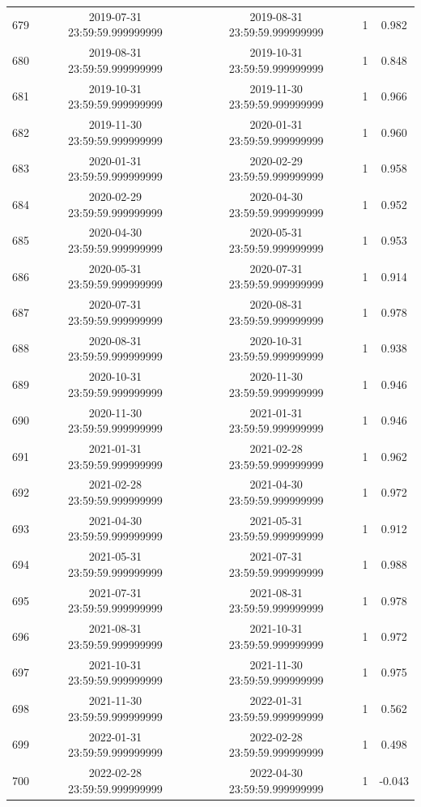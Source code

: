 \begin{table}
\begin{tabular}{lcccc}
679 & 2019-07-31 23:59:59.999999999 & 2019-08-31 23:59:59.999999999 & 1 & 0.982 \\
680 & 2019-08-31 23:59:59.999999999 & 2019-10-31 23:59:59.999999999 & 1 & 0.848 \\
681 & 2019-10-31 23:59:59.999999999 & 2019-11-30 23:59:59.999999999 & 1 & 0.966 \\
682 & 2019-11-30 23:59:59.999999999 & 2020-01-31 23:59:59.999999999 & 1 & 0.960 \\
683 & 2020-01-31 23:59:59.999999999 & 2020-02-29 23:59:59.999999999 & 1 & 0.958 \\
684 & 2020-02-29 23:59:59.999999999 & 2020-04-30 23:59:59.999999999 & 1 & 0.952 \\
685 & 2020-04-30 23:59:59.999999999 & 2020-05-31 23:59:59.999999999 & 1 & 0.953 \\
686 & 2020-05-31 23:59:59.999999999 & 2020-07-31 23:59:59.999999999 & 1 & 0.914 \\
687 & 2020-07-31 23:59:59.999999999 & 2020-08-31 23:59:59.999999999 & 1 & 0.978 \\
688 & 2020-08-31 23:59:59.999999999 & 2020-10-31 23:59:59.999999999 & 1 & 0.938 \\
689 & 2020-10-31 23:59:59.999999999 & 2020-11-30 23:59:59.999999999 & 1 & 0.946 \\
690 & 2020-11-30 23:59:59.999999999 & 2021-01-31 23:59:59.999999999 & 1 & 0.946 \\
691 & 2021-01-31 23:59:59.999999999 & 2021-02-28 23:59:59.999999999 & 1 & 0.962 \\
692 & 2021-02-28 23:59:59.999999999 & 2021-04-30 23:59:59.999999999 & 1 & 0.972 \\
693 & 2021-04-30 23:59:59.999999999 & 2021-05-31 23:59:59.999999999 & 1 & 0.912 \\
694 & 2021-05-31 23:59:59.999999999 & 2021-07-31 23:59:59.999999999 & 1 & 0.988 \\
695 & 2021-07-31 23:59:59.999999999 & 2021-08-31 23:59:59.999999999 & 1 & 0.978 \\
696 & 2021-08-31 23:59:59.999999999 & 2021-10-31 23:59:59.999999999 & 1 & 0.972 \\
697 & 2021-10-31 23:59:59.999999999 & 2021-11-30 23:59:59.999999999 & 1 & 0.975 \\
698 & 2021-11-30 23:59:59.999999999 & 2022-01-31 23:59:59.999999999 & 1 & 0.562 \\
699 & 2022-01-31 23:59:59.999999999 & 2022-02-28 23:59:59.999999999 & 1 & 0.498 \\
700 & 2022-02-28 23:59:59.999999999 & 2022-04-30 23:59:59.999999999 & 1 & -0.043 \\

\end{tabular}
\end{table}
